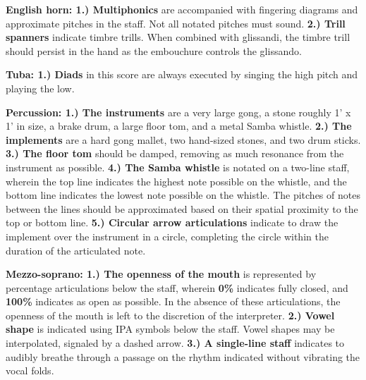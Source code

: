 \documentclass[11pt]{article}
\begin{document}
\begingroup
\textbf{English horn: 1.) Multiphonics} are accompanied with fingering diagrams and approximate pitches in the staff. Not all notated pitches must sound. \textbf{2.) Trill spanners} indicate timbre trills. When combined with glissandi, the timbre trill should persist in the hand as the embouchure controls the glissando.
\endgroup

\begingroup
\textbf{Tuba: 1.) Diads} in this score are always executed by singing the high pitch and playing the low. 
\endgroup

\begingroup
\textbf{Percussion: 1.) The instruments} are a very large gong, a stone roughly 1' x 1' in size, a brake drum, a large floor tom, and a metal Samba whistle. \textbf{2.) The implements} are a hard gong mallet, two hand-sized stones, and two drum sticks. \textbf{3.) The floor tom} should be damped, removing as much resonance from the instrument as possible. \textbf{4.) The Samba whistle} is notated on a two-line staff, wherein the top line indicates the highest note possible on the whistle, and the bottom line indicates the lowest note possible on the whistle. The pitches of notes between the lines should be approximated based on their spatial proximity to the top or bottom line. \textbf{5.) Circular arrow articulations} indicate to draw the implement over the instrument in a circle, completing the circle within the duration of the articulated note.
\endgroup

\begingroup
\textbf{Mezzo-soprano: 1.) The openness of the mouth} is represented by percentage articulations below the staff, wherein \textbf{0\%} indicates fully closed, and \textbf{100\%} indicates as open as possible. In the absence of these articulations, the openness of the mouth is left to the discretion of the interpreter. \textbf{2.) Vowel shape} is indicated using IPA symbols below the staff. Vowel shapes may be interpolated, signaled by a dashed arrow. \textbf{3.) A single-line staff} indicates to audibly breathe through a passage on the rhythm indicated without vibrating the vocal folds.
\endgroup
\end{document}
